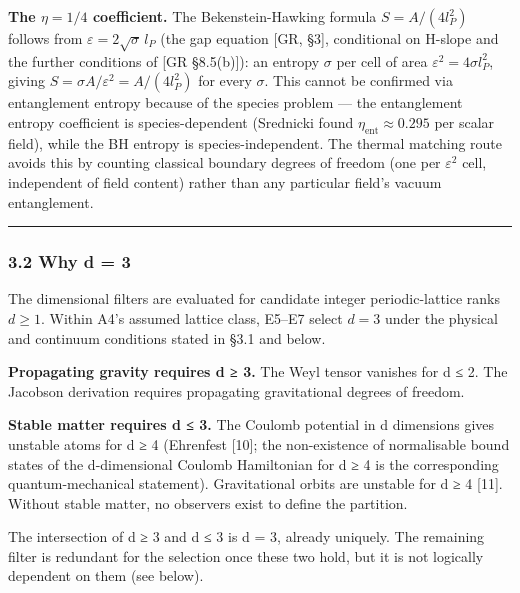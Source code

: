 \documentclass[
]{article}
\begin{document}
\textbf{The \(\eta = 1/4\) coefficient.} The Bekenstein-Hawking formula
\(S = A/(4l_P^2)\) follows from \(\varepsilon = 2\sqrt{\sigma}\,l_P\)
(the gap equation {[}GR, §3{]}, conditional on H-slope and the further
conditions of {[}GR §8.5(b){]}): an entropy \(\sigma\) per cell of area
\(\varepsilon^2 = 4\sigma l_P^2\), giving
\(S = \sigma A/\varepsilon^2 = A/(4l_P^2)\) for every \(\sigma\). This
cannot be confirmed via entanglement entropy because of the species
problem --- the entanglement entropy coefficient is species-dependent
(Srednicki found \(\eta_{\text{ent}} \approx 0.295\) per scalar field),
while the BH entropy is species-independent. The thermal matching route
avoids this by counting classical boundary degrees of freedom (one per
\(\varepsilon^2\) cell, independent of field content) rather than any
particular field's vacuum entanglement.

\begin{center}\rule{0.5\linewidth}{0.5pt}\end{center}

\hypertarget{why-d-3}{%
\subsubsection{3.2 Why d = 3}\label{why-d-3}}

The dimensional filters are evaluated for candidate integer
periodic-lattice ranks \(d \geq 1\). Within A4's assumed lattice class,
E5--E7 select \(d = 3\) under the physical and continuum conditions
stated in §3.1 and below.

\textbf{Propagating gravity requires d ≥ 3.} The Weyl tensor vanishes
for d ≤ 2. The Jacobson derivation requires propagating gravitational
degrees of freedom.

\textbf{Stable matter requires d ≤ 3.} The Coulomb potential in d
dimensions gives unstable atoms for d ≥ 4 (Ehrenfest {[}10{]}; the
non-existence of normalisable bound states of the d-dimensional Coulomb
Hamiltonian for d ≥ 4 is the corresponding quantum-mechanical
statement). Gravitational orbits are unstable for d ≥ 4 {[}11{]}.
Without stable matter, no observers exist to define the partition.

The intersection of d ≥ 3 and d ≤ 3 is d = 3, already uniquely. The
remaining filter is redundant for the selection once these two hold, but
it is not logically dependent on them (see below).
\end{document}
